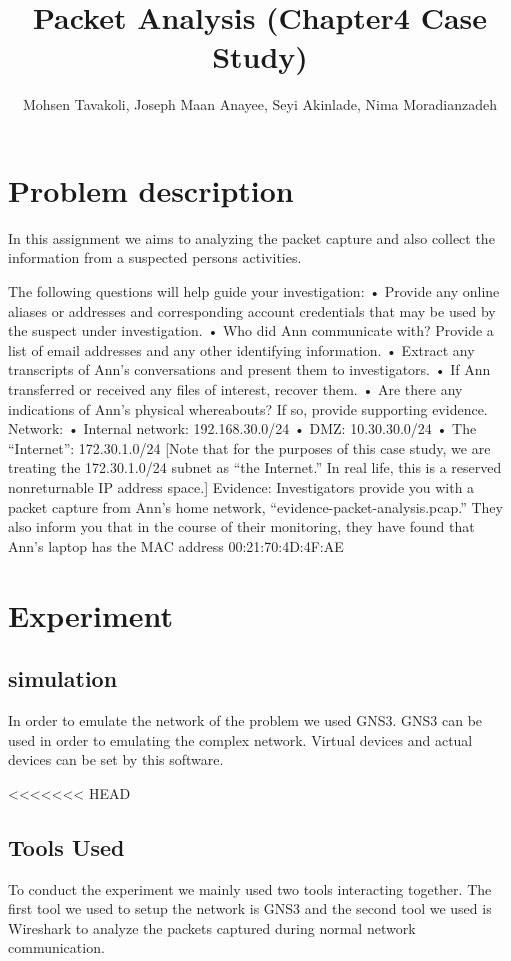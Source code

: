 \documentclass{article}
\title{Packet Analysis (Chapter4 Case Study)}
\author{Mohsen Tavakoli, Joseph Maan Anayee, Seyi Akinlade, Nima Moradianzadeh}
\begin{document}
\maketitle

\section{Problem description}
In this assignment we aims to analyzing the packet capture and also collect the information from a suspected persons activities.
 
The following questions will help guide your investigation:
• Provide any online aliases or addresses and corresponding account credentials that
may be used by the suspect under investigation.
• Who did Ann communicate with? Provide a list of email addresses and any other
identifying information.
• Extract any transcripts of Ann’s conversations and present them to investigators.
• If Ann transferred or received any files of interest, recover them.
• Are there any indications of Ann’s physical whereabouts? If so, provide supporting
evidence.
Network:
• Internal network: 192.168.30.0/24
• DMZ: 10.30.30.0/24
• The “Internet”: 172.30.1.0/24 [Note that for the purposes of this case study, we are
treating the 172.30.1.0/24 subnet as “the Internet.” In real life, this is a reserved nonreturnable
IP address space.]
Evidence: Investigators provide you with a packet capture from Ann’s home network,
“evidence-packet-analysis.pcap.” They also inform you that in the course of their monitoring,
they have found that Ann’s laptop has the MAC address 00:21:70:4D:4F:AE
\section{Experiment}
\subsection{simulation}
In order to emulate the network of the problem we used GNS3. GNS3 can be used in order to emulating the complex network. Virtual devices and actual devices can be set by this software\cite{amyot2014system}.



<<<<<<< HEAD
\subsection{Tools Used}
To conduct the experiment we mainly used two tools interacting together. The first tool we used to setup the network is GNS3 and the second tool we used is Wireshark to analyze the packets captured during normal network communication.
\end{document}
